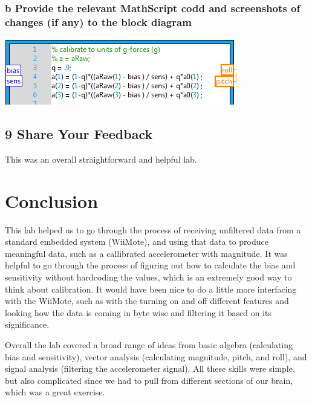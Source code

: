 \documentclass[10pt,a4paper]{article}
\begin{document}
    \subsubsection*{b Provide the relevant MathScript codd and screenshots of changes (if any) to the block diagram}
      \includegraphics{../lab1_data/lab1_8a.PNG} 
  \subsection*{9 Share Your Feedback}
    This was an overall straightforward and helpful lab.
\section*{Conclusion}
  This lab helped us to go through the process of receiving unfiltered data from a standard embedded system (WiiMote), and using that data to produce meaningful data, such as a callibrated accelerometer with magnitude. It was helpful to go through the process of figuring out how to calculate the bias and sensitivity without hardcoding the values, which is an extremely good way to think about calibration. It would have been nice to do a little more interfacing with the WiiMote, such as with the turning on and off different features and looking how the data is coming in byte wise and filtering it based on its significance.
  
  Overall the lab covered a broad range of ideas from basic algebra (calculating bias and sensitivity), vector analysis (calculating magnitude, pitch, and roll), and signal analysis (filtering the accelerometer signal). All these skills were simple, but also complicated since we had to pull from different sections of our brain, which was a great exercise. 
\end{document}
